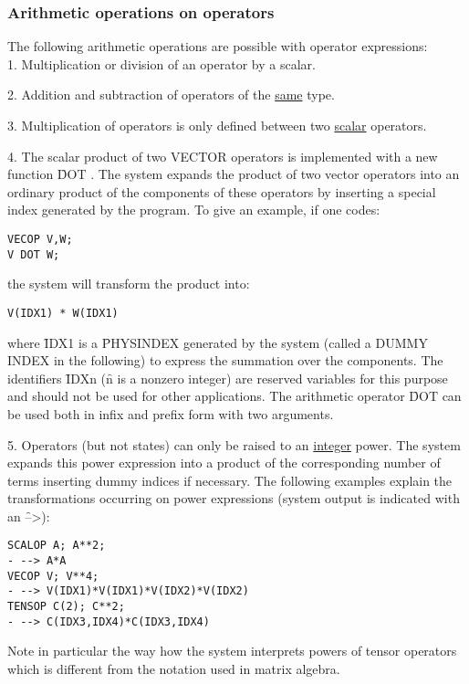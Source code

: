 \subsubsection{Arithmetic operations on operators}

The following arithmetic operations are possible with
operator expressions: \\

1. Multiplication or division of an operator by a scalar.

2. Addition and subtraction of operators of the \underline{same} type.

3. Multiplication of operators is only defined between two
\underline{scalar} operators.

4. The scalar product of two VECTOR operators is implemented with
a new function \f{DOT} . The system expands the product of
two vector operators into an ordinary product of the components of these
operators by inserting a special index generated by the program.
To give an example, if one codes: \\

\begin{verbatim}
VECOP V,W;
V DOT W;
\end{verbatim}
the system will transform the product into: \\

\begin{verbatim}
V(IDX1) * W(IDX1)
\end{verbatim}
where \f{IDX1} is a \f{PHYSINDEX} generated by the system (called a DUMMY
INDEX in the following) to express the summation over the components.
The identifiers \f{IDXn} (\f{n} is
a nonzero integer) are
reserved variables for this purpose and should not be used for other
applications. The arithmetic operator
\f{DOT} can be used both in infix and prefix form with two arguments.

5. Operators (but not states) can only be raised to an
\underline{integer} power. The system expands this power
expression into a product of the corresponding number of terms
inserting dummy indices if necessary. The following examples explain
the transformations occurring on power expressions (system output
is indicated with an \f{-->}): \\

\begin{verbatim}
SCALOP A; A**2;
- --> A*A
VECOP V; V**4;
- --> V(IDX1)*V(IDX1)*V(IDX2)*V(IDX2)
TENSOP C(2); C**2;
- --> C(IDX3,IDX4)*C(IDX3,IDX4)
\end{verbatim}
Note in particular the way how the system interprets powers of
tensor operators which is different from the notation used in matrix
algebra.

